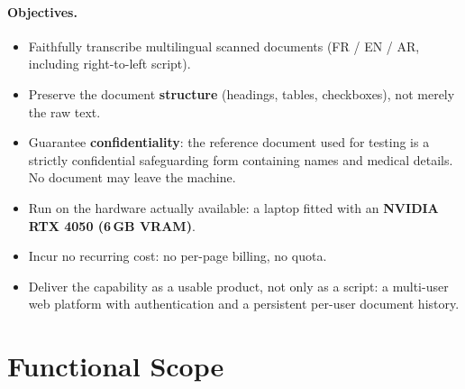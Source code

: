 \documentclass[11pt,a4paper]{article}
\begin{document}
\paragraph{Objectives.}
\begin{itemize}
  \item Faithfully transcribe multilingual scanned documents (FR / EN / AR,
        including right-to-left script).
  \item Preserve the document \textbf{structure} (headings, tables, checkboxes),
        not merely the raw text.
  \item Guarantee \textbf{confidentiality}: the reference document used for
        testing is a strictly confidential safeguarding form containing names
        and medical details. No document may leave the machine.
  \item Run on the hardware actually available: a laptop fitted with an
        \textbf{NVIDIA RTX 4050 (6\,GB VRAM)}.
  \item Incur no recurring cost: no per-page billing, no quota.
  \item Deliver the capability as a usable product, not only as a script: a
        multi-user web platform with authentication and a persistent
        per-user document history.
\end{itemize}

\section{Functional Scope}
\end{document}
